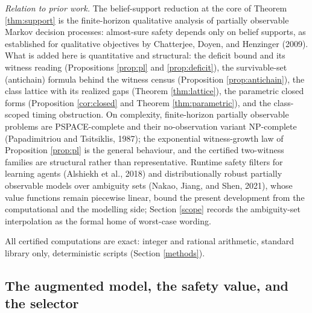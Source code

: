 \documentclass[10pt,twocolumn]{article}
\theoremstyle{plain}
\theoremstyle{definition}
\theoremstyle{remark}
\begin{document}
\emph{Relation to prior work.} The belief-support reduction at the core
of Theorem \ref{thm:support} is the finite-horizon qualitative analysis
of partially observable Markov decision processes: almost-sure safety
depends only on belief supports, as established for qualitative
objectives by Chatterjee, Doyen, and Henzinger (2009). What is added
here is quantitative and structural: the deficit bound and its witness
reading (Propositions \ref{prop:pl} and \ref{prop:deficit}), the
survivable-set (antichain) formula behind the witness census
(Proposition \ref{prop:antichain}), the class lattice with its realized
gaps (Theorem \ref{thm:lattice}), the parametric closed forms
(Proposition \ref{cor:closed} and Theorem \ref{thm:parametric}), and the
class-scoped timing obstruction. On complexity, finite-horizon partially
observable problems are PSPACE-complete and their no-observation variant
NP-complete (Papadimitriou and Tsitsiklis, 1987); the exponential
witness-growth law of Proposition \ref{prop:pl} is the general behaviour, and the certified two-witness families are structural rather
than representative. Runtime safety filters for learning agents
(Alshiekh et al., 2018) and distributionally robust partially observable
models over ambiguity sets (Nakao, Jiang, and Shen, 2021), whose value
functions remain piecewise linear, bound the present development from
the computational and the modelling side; Section \ref{scope} records
the ambiguity-set interpolation as the formal home of worst-case
wording.

All certified computations are exact: integer and rational arithmetic,
standard library only, deterministic scripts (Section \ref{methods}).

\subsection{The augmented model, the safety value, and the selector}\label{model}
\end{document}
